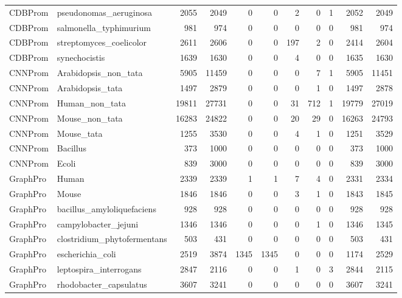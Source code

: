 \begin{longtable}{@{}llrrrrrrrrr@{}}
CDBProm & pseudonomas\_aeruginosa & 2055 & 2049 & 0 & 0 & 2 & 0 & 1 & 2052 & 2049 \\
CDBProm & salmonella\_typhimurium & 981 & 974 & 0 & 0 & 0 & 0 & 0 & 981 & 974 \\
CDBProm & streptomyces\_coelicolor & 2611 & 2606 & 0 & 0 & 197 & 2 & 0 & 2414 & 2604 \\
CDBProm & synechocistis & 1639 & 1630 & 0 & 0 & 4 & 0 & 0 & 1635 & 1630 \\
CNNProm & Arabidopsis\_non\_tata & 5905 & 11459 & 0 & 0 & 0 & 7 & 1 & 5905 & 11451 \\
CNNProm & Arabidopsis\_tata & 1497 & 2879 & 0 & 0 & 0 & 1 & 0 & 1497 & 2878 \\
CNNProm & Human\_non\_tata & 19811 & 27731 & 0 & 0 & 31 & 712 & 1 & 19779 & 27019 \\
CNNProm & Mouse\_non\_tata & 16283 & 24822 & 0 & 0 & 20 & 29 & 0 & 16263 & 24793 \\
CNNProm & Mouse\_tata & 1255 & 3530 & 0 & 0 & 4 & 1 & 0 & 1251 & 3529 \\
CNNProm & Bacillus & 373 & 1000 & 0 & 0 & 0 & 0 & 0 & 373 & 1000 \\
CNNProm & Ecoli & 839 & 3000 & 0 & 0 & 0 & 0 & 0 & 839 & 3000 \\
GraphPro & Human & 2339 & 2339 & 1 & 1 & 7 & 4 & 0 & 2331 & 2334 \\
GraphPro & Mouse & 1846 & 1846 & 0 & 0 & 3 & 1 & 0 & 1843 & 1845 \\
GraphPro & bacillus\_amyloliquefaciens & 928 & 928 & 0 & 0 & 0 & 0 & 0 & 928 & 928 \\
GraphPro & campylobacter\_jejuni & 1346 & 1346 & 0 & 0 & 0 & 1 & 0 & 1346 & 1345 \\
GraphPro & clostridium\_phytofermentans & 503 & 431 & 0 & 0 & 0 & 0 & 0 & 503 & 431 \\
GraphPro & escherichia\_coli & 2519 & 3874 & 1345 & 1345 & 0 & 0 & 0 & 1174 & 2529 \\
GraphPro & leptospira\_interrogans & 2847 & 2116 & 0 & 0 & 1 & 0 & 3 & 2844 & 2115 \\
GraphPro & rhodobacter\_capsulatus & 3607 & 3241 & 0 & 0 & 0 & 0 & 0 & 3607 & 3241 \\
\end{longtable}
\endgroup
